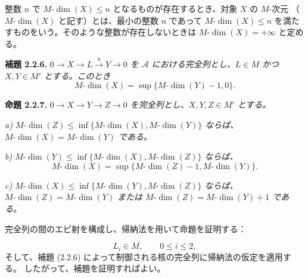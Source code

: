 \clearpage
{}%
\begingroup\small\setlength{\parskip}{0pt}\setlength{\emergencystretch}{1.5em}
\setlength{\abovedisplayskip}{4pt plus 2pt minus 2pt}%
\setlength{\belowdisplayskip}{4pt plus 2pt minus 2pt}%

整数 $n$ で $M\text{-}\dim(X)\leq n$ となるものが存在するとき、対象 $X$ の $M$-次元
（$M\text{-}\dim(X)$ と記す）とは、最小の整数 $n$ であって
$M\text{-}\dim(X)\leq n$ を満たすものをいう。そのような整数が存在しないときは
$M\text{-}\dim(X)=+\infty$ と定める。

\medskip\noindent\textbf{補題 2.2.6.}\quad
\textit{$0\longrightarrow X\longrightarrow L\xrightarrow{u}Y\longrightarrow0$
を $\mathcal A$ における完全列とし、$L\in M$ かつ $X,Y\in M'$ とする。このとき}
\[
M\text{-}\dim(X)=\sup\{M\text{-}\dim(Y)-1,0\}.
\]

\medskip\noindent\textbf{命題 2.2.7.}\quad
\textit{$0\longrightarrow X\longrightarrow Y\longrightarrow Z\longrightarrow0$
を完全列とし、$X,Y,Z\in M'$ とする。}

\noindent\textit{a) 
$M\text{-}\dim(Z)\leq
\inf\{M\text{-}\dim(X),M\text{-}\dim(Y)\}$ ならば、
$M\text{-}\dim(X)=M\text{-}\dim(Y)$ である。}

\noindent\textit{b) 
$M\text{-}\dim(Y)\leq
\inf\{M\text{-}\dim(X),M\text{-}\dim(Z)\}$ ならば、}
\[
M\text{-}\dim(X)=
\sup\{M\text{-}\dim(Z)-1,M\text{-}\dim(Y)\}.
\]

\noindent\textit{c) 
$M\text{-}\dim(X)\leq
\inf\{M\text{-}\dim(Y),M\text{-}\dim(Z)\}$ ならば、
$M\text{-}\dim(Z)=M\text{-}\dim(Y)$ または
$M\text{-}\dim(Z)=M\text{-}\dim(Y)+1$ である。}

完全列の間のエピ射を構成し、帰納法を用いて命題を証明する：

\begin{center}
\end{center}
\[
L_i\in M,\qquad 0\leq i\leq2,
\]
そして、補題 (2.2.6) によって制御される核の完全列に帰納法の仮定を適用する。
したがって、補題を証明すればよい。

